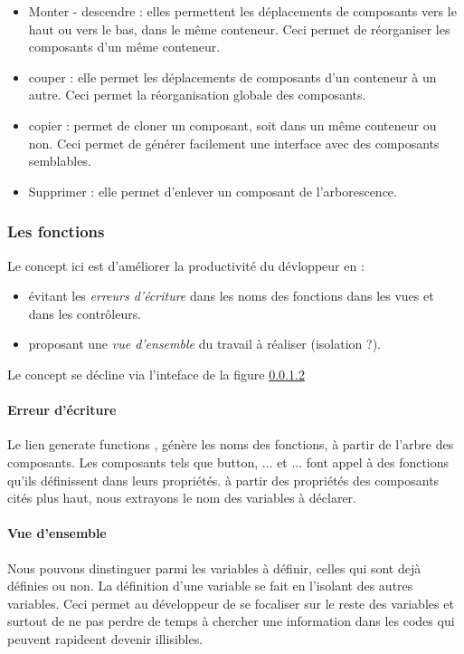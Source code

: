 \documentclass[a4paper,12pt]{article}
\begin{document}
\begin{itemize}
\item Monter - descendre : elles permettent les déplacements de
  composants vers le haut ou vers le bas, dans le même conteneur. Ceci
  permet de réorganiser les composants d'un même conteneur.

\item couper : elle permet les déplacements de composants d'un
  conteneur à un autre. Ceci permet la réorganisation globale des
  composants.
\item copier : permet de cloner
 un composant, soit dans un même
  conteneur ou non. Ceci permet de générer facilement une interface avec
  des composants semblables.
\item Supprimer : elle permet d'enlever un composant de l'arborescence.
\end{itemize}

	

\subsubsection{ Les fonctions}
Le concept ici est d'améliorer la productivité du dévloppeur en :
\begin{itemize}
\item évitant les {\em erreurs d'écriture} dans les noms des
fonctions dans les vues et dans les contrôleurs.
\item proposant une {\em vue d'ensemble} du travail à réaliser (isolation ?).
\end{itemize}

Le concept se décline via l'inteface de la figure \ref{}

\paragraph{Erreur d'écriture}
Le lien \og generate functions \fg, génère les noms des fonctions, à
partir de l'arbre des composants. Les composants tels que button,
... et ... font appel à des fonctions qu'ils définissent dans leurs
propriétés. à partir des propriétés des composants cités plus haut,
nous extrayons le nom des variables à déclarer.

\paragraph{Vue d'ensemble}
Nous pouvons dinstinguer parmi les variables à définir, celles qui
sont dejà définies ou non. La définition d'une variable se fait en
l'isolant des autres variables. Ceci permet au
développeur de se focaliser sur le reste des variables et surtout de
ne pas perdre de temps à chercher une information dans les codes qui
peuvent rapideent devenir illisibles.
\end{document}
